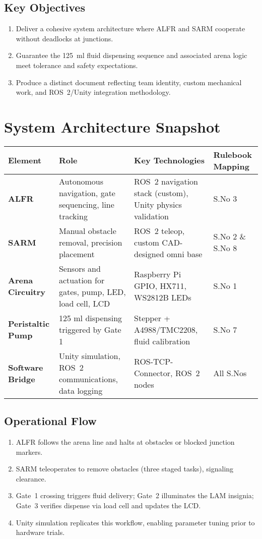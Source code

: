 \documentclass[12pt]{article}
\begin{document}
\subsection{Key Objectives}
\begin{enumerate}
    \item Deliver a cohesive system architecture where ALFR and SARM cooperate without deadlocks at junctions.
    \item Guarantee the 125~ml fluid dispensing sequence and associated arena logic meet tolerance and safety expectations.
    \item Produce a distinct document reflecting team identity, custom mechanical work, and ROS~2/Unity integration methodology.
\end{enumerate}

\section{System Architecture Snapshot}
\begin{tabularx}{\textwidth}{>{\bfseries}lYYY}
\toprule
Element & Role & Key Technologies & Rulebook Mapping \\
\midrule
ALFR & Autonomous navigation, gate sequencing, line tracking & ROS~2 navigation stack (custom), Unity physics validation & S.No 3 \\
SARM & Manual obstacle removal, precision placement & ROS~2 teleop, custom CAD-designed omni base & S.No 2 \& S.No 8 \\
Arena Circuitry & Sensors and actuation for gates, pump, LED, load cell, LCD & Raspberry Pi GPIO, HX711, WS2812B LEDs & S.No 1 \\
Peristaltic Pump & 125 ml dispensing triggered by Gate 1 & Stepper + A4988/TMC2208, fluid calibration & S.No 7 \\
Software Bridge & Unity simulation, ROS~2 communications, data logging & ROS-TCP-Connector, ROS~2 nodes & All S.Nos \\
\bottomrule
\end{tabularx}

\subsection{Operational Flow}
\begin{enumerate}
    \item ALFR follows the arena line and halts at obstacles or blocked junction markers.
    \item SARM teleoperates to remove obstacles (three staged tasks), signaling clearance.
    \item Gate~1 crossing triggers fluid delivery; Gate~2 illuminates the LAM insignia; Gate~3 verifies dispense via load cell and updates the LCD.
    \item Unity simulation replicates this workflow, enabling parameter tuning prior to hardware trials.
\end{enumerate}
\end{document}
